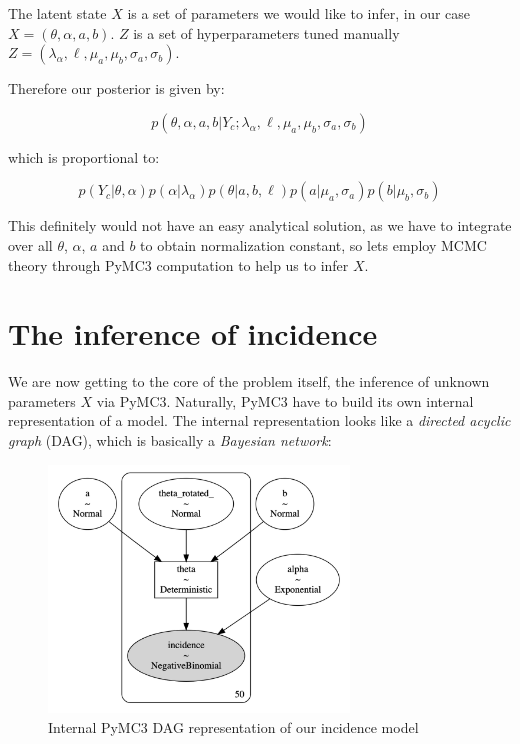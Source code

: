 \documentclass[
  digital, %
  oneside, %
  lof,     %
  lot,     %
]{fithesis4}
\begin{document}
The latent state $X$ is a set of parameters we would like
to infer, in our case $X = (\theta, \alpha, a, b)$.
$Z$ is a set of hyperparameters tuned manually 
$Z = (\lambda_\alpha, \ell, \mu_a, \mu_b, \sigma_a, \sigma_b)$.

Therefore our posterior is given by:

\begin{equation}
  p \left( \theta, \alpha, a, b | Y_c; \lambda_\alpha, \ell, \mu_a, \mu_b, \sigma_a, \sigma_b \right)
\end{equation}

which is proportional to:

\begin{equation}\label{eq:inc-model-joint-expanded}
   p( Y_c | \theta, \alpha ) p( \alpha | \lambda_\alpha ) p ( \theta | a, b, \ell ) p ( a | \mu_a, \sigma_a ) p ( b | \mu_b, \sigma_b )
\end{equation}

This definitely would not have an easy analytical solution,
as we have to integrate over all
$\theta$, $\alpha$, $a$ and $b$ to obtain normalization constant,
so lets employ MCMC theory through PyMC3 computation to
help us to infer $X$.


\section{The inference of incidence}
\label{sec:inference-of-incidence}

We are now getting to the core of the problem itself, 
the inference of unknown 
parameters $X$ via PyMC3. Naturally, PyMC3 have to build 
its own internal representation of a model.
The internal representation looks like
a \textit{directed acyclic graph} (DAG), which
is basically a \textit{Bayesian network}:

\begin{figure}[H]
  \begin{center}
    \includegraphics[width=8cm]{static/images/inc-model-graphviz.png}
  \end{center}
  \caption{Internal PyMC3 DAG representation of our incidence model}
  \label{fig:inc-model-graphviz}
\end{figure}
\end{document}
